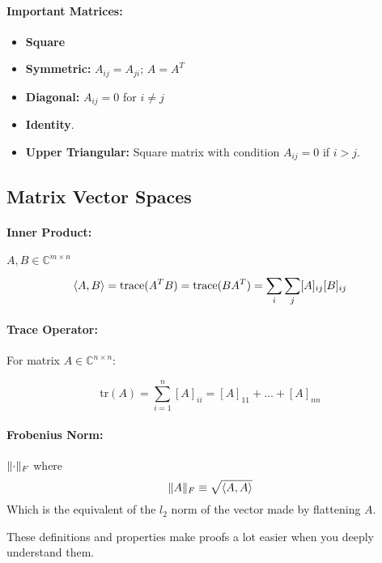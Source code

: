 \documentclass[a4paper,12pt]{report}
\DeclarePairedDelimiter\norm{\lVert}{\rVert}%
\DeclarePairedDelimiter\inpr{\langle}{\rangle}%
\begin{document}
\paragraph{Important Matrices: } 
\begin{itemize}
\item \textbf{Square}
\item \textbf{Symmetric: } $A_{ij} = A_{ji}$; $A = A^T$
\item \textbf{Diagonal: } $A_{ij} = 0$ for $i \neq j$
\item \textbf{Identity}.
\item \textbf{Upper Triangular:} Square matrix with condition $A_{ij} = 0$ if $i > j$.
\end{itemize}

\subsection{Matrix Vector Spaces}

\paragraph{Inner Product: } $A, B \in \mathbb{C}^{m\times n}$ 
\begin{equation}
	\inpr{A, B} = \text{trace}(A^T B) = \text{trace}(BA^T) = \sum_{i}^{} \sum_{j}^{} [A]_{ij} [B]_{ij}
\end{equation}

\paragraph{Trace Operator: } For matrix $A\in \mathbb{C}^{n\times n}$:

\begin{equation}
		\text{tr}(A) = \sum_{i=1}^{n} [A]_{ii} = [A]_{11} + ... + [A]_{nn}
\end{equation}

\paragraph{Frobenius Norm: } $\norm{\cdot}_F$ where
\begin{equation}
\norm{A}_F \equiv \sqrt{\inpr{A,A}}
\end{equation}
Which is the equivalent of the $l_2$ norm of the vector made by flattening $A$.


These definitions and properties make proofs a lot easier when you deeply understand them. 
\end{document}
